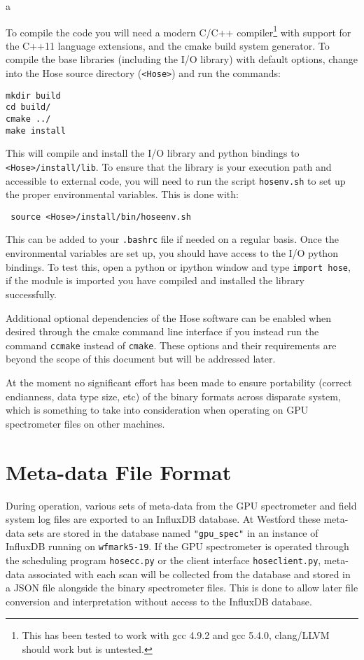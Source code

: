 a\documentclass[a4paper,14pt]{article}
\begin{document}
To compile the code you will need a modern C/C++ compiler\footnote{This has been tested to work with gcc 4.9.2 and gcc 5.4.0, clang/LLVM should work but is untested.} with support for the C++11 language extensions, and
the cmake build system generator. To compile the base libraries (including the I/O library) with default options, change into the Hose source directory (\verb|<Hose>|) and run the commands:
\begin{lstlisting}
mkdir build
cd build/
cmake ../
make install
\end{lstlisting}
This will compile and install the I/O library and python bindings to \verb|<Hose>/install/lib|. To ensure that the library is your execution path and accessible to external code, you will need to run the script \verb|hosenv.sh|
to set up the proper environmental variables. This is done with:
\begin{lstlisting}
 source <Hose>/install/bin/hoseenv.sh
\end{lstlisting}
This can be added to your \verb|.bashrc| file if needed on a regular basis. Once the environmental variables are set up, you should have access to the I/O python bindings. To test this, open a python or ipython window
and type \verb|import hose|, if the module is imported you have compiled and installed the library successfully.

Additional optional dependencies of the Hose software can be enabled when desired through the cmake command line interface if you instead run the command \verb|ccmake| instead of \verb|cmake|. These options and 
their requirements are beyond the scope of this document but will be addressed later.

At the moment no significant effort has been made to ensure portability (correct endianness, data type size, etc) of the binary formats across disparate system, which is something to take into consideration
when operating on GPU spectrometer files on other machines.


\section{Meta-data File Format}

During operation, various sets of meta-data from the GPU spectrometer and field system log files are exported to an InfluxDB database. At Westford these meta-data sets are stored in the database named \verb|"gpu_spec"| in an instance of InfluxDB 
running on \verb|wfmark5-19|. If the GPU spectrometer is operated through the scheduling program \verb|hosecc.py| or the client interface \verb|hoseclient.py|, meta-data associated with each scan will be collected from the database and 
stored in a JSON file alongside the binary spectrometer files. This is done to allow later file conversion and interpretation without access to the InfluxDB database.
\end{document}
